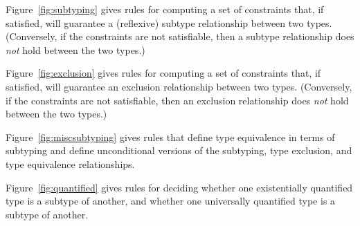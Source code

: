 

Figure~\ref{fig:subtyping} gives rules for computing a set of constraints that, if satisfied, will guarantee a (reflexive) subtype relationship between two types.
(Conversely, if the constraints are not satisfiable, then a subtype relationship does \emph{not} hold between the two types.)



Figure~\ref{fig:exclusion} gives rules for computing a set of constraints that, if satisfied, will guarantee an exclusion relationship between two types.
(Conversely, if the constraints are not satisfiable, then an exclusion relationship does \emph{not} hold between the two types.)

\clearpage



Figure~\ref{fig:miscsubtyping} gives rules that define type equivalence in terms of subtyping and define
unconditional versions of the subtyping, type exclusion, and type equivalence relationships.



Figure~\ref{fig:quantified} gives rules for deciding whether one existentially quantified type is a subtype of another,
and whether one universally quantified type is a subtype of another.

\clearpage
\clearpage
\clearpage
\clearpage
